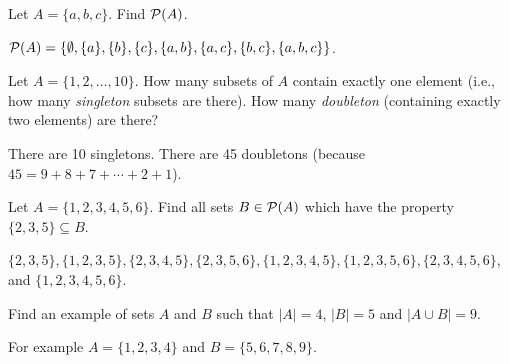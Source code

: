 \begin{questions}
  \begin{answer}
  \end{answer}


  
  
\question Let $A = \{a, b, c\}$.  Find $\mathcal P(A)$.

  \begin{answer}
    $\mathcal P(A) = \{\emptyset, \{a\}, \{b\}, \{c\}, \{a,b\}, \{a,c\}, \{b,c\}, \{a,b,c\}\}$.
  \end{answer}

  
  

\question Let $A = \{1,2,\ldots, 10\}$.  How many subsets of $A$ contain exactly one element (i.e., how many {\em singleton} subsets are there).  How many {\em doubleton} (containing exactly two elements) are there?

  \begin{answer}
      There are 10 singletons.  There are 45 doubletons (because $45 = 9+8+7+\cdots+2+1$).
  \end{answer}


  
  
\question Let $A = \{1,2,3,4,5,6\}$.  Find all sets $B \in \mathcal P(A)$ which have the property $\{2,3,5\} \subseteq B$.

  \begin{answer}
      $\{2,3,5\}, \{1,2,3,5\}, \{2,3,4,5\}, \{2,3,5,6\}, \{1,2,3,4,5\}, \{1,2,3,5,6\}, \{2,3,4,5,6\}$, and $\{1,2,3,4,5,6\}$.
  \end{answer}


  
\question Find an example of sets $A$ and $B$ such that $|A| = 4$, $|B| = 5$ and $|A \cup B| = 9$.  

  \begin{answer}
   For example $A = \{1,2,3,4\}$ and $B = \{5,6,7,8,9\}$.
  \end{answer}


\end{questions}
